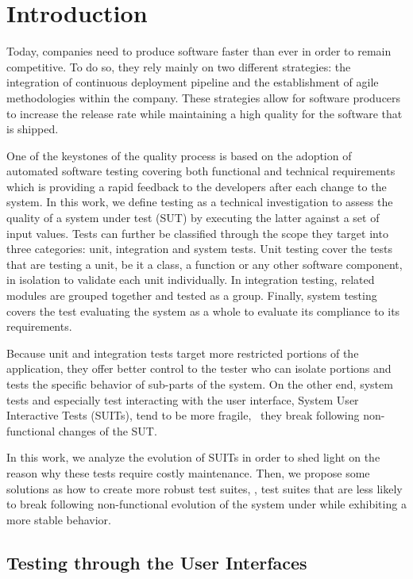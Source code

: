 \chapter{Introduction}

Today, companies need to produce software faster than ever in order to remain competitive. To do so, they rely mainly on two different strategies: the integration of continuous deployment pipeline and the establishment of agile methodologies within the company. These strategies allow for software producers to increase the release rate while maintaining a high quality for the software that is shipped.

One of the keystones of the quality process is based on the adoption of automated software testing covering both functional and technical requirements which is providing a rapid feedback to the developers after each change to the system. In this work, we define testing as a technical investigation to assess the quality of a system under test (SUT) by executing the latter against a set of input values. Tests can further be classified through the scope they target into three categories: unit, integration and system tests. Unit testing cover the tests that are testing a unit, be it a class, a function or any other software component, in isolation to validate each unit individually. In integration testing, related modules are grouped together and tested as a group. Finally, system testing covers the test evaluating the system as a whole to evaluate its compliance to its requirements.

Because unit and integration tests target more restricted portions of the application, they offer better control to the tester who can isolate portions and tests the specific behavior of sub-parts of the system. On the other end, system tests and especially test interacting with the user interface, System User Interactive Tests (SUITs), tend to be more fragile, \ie\ they break following non-functional changes of the SUT.

In this work, we analyze the evolution of SUITs in order to shed light on the reason why these tests require costly maintenance. Then, we propose some solutions as how to create more robust test suites, \ie, test suites that are less likely to break following non-functional evolution of the system under while exhibiting a more stable behavior.


\section{Testing through the User Interfaces}

